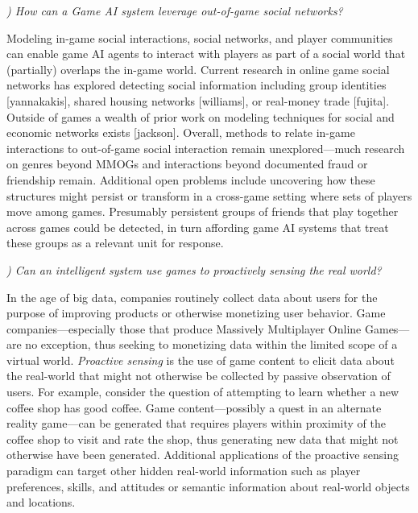 \documentclass[conference]{IEEEtran}
\newcounter{questionno}
\newcommand{\subsubsectionx}[1]{{\em {\arabic{questionno}) #1}}
	\addtocounter{questionno}{1}
	}
\begin{document}
\subsubsectionx{How can a Game AI system leverage out-of-game social networks?}
%
Modeling in-game social interactions, social networks, and player communities can enable game AI agents to interact with players as part of a social world that (partially) overlaps the in-game world. Current research in online game social networks has explored detecting social information including group identities [yannakakis], shared housing networks [williams], or real-money trade [fujita]. 
Outside of games a wealth of prior work on modeling techniques for social and economic networks exists [jackson].
%
Overall, methods to relate in-game interactions to out-of-game social interaction remain unexplored---much research on genres beyond MMOGs and interactions beyond documented fraud or friendship remain. Additional open problems include uncovering how these structures might persist or transform in a cross-game setting where sets of players move among games. Presumably persistent groups of friends that play together across games could be detected, in turn affording game AI systems that treat these groups as a relevant unit for response.


\subsubsectionx{Can an intelligent system use games to proactively sensing the real world?}
%
In the age of big data, companies routinely collect data about users for the purpose of improving products or otherwise monetizing user behavior. 
Game companies---especially those that produce Massively Multiplayer Online Games---are no exception, thus seeking to monetizing data within the limited scope of a virtual world.
{\em Proactive sensing} is the use of game content to elicit data about the real-world that might not otherwise be collected by passive observation of users.
%
For example, consider the question of attempting to learn whether a new coffee shop has good coffee.
Game content---possibly a quest in an alternate reality game---can be generated that requires players within proximity of the coffee shop to visit and rate the shop, thus generating new data that might not otherwise have been generated.
Additional applications of the proactive sensing paradigm can target other hidden real-world information such as player preferences, skills, and attitudes or semantic information about real-world objects and locations.
\end{document}
